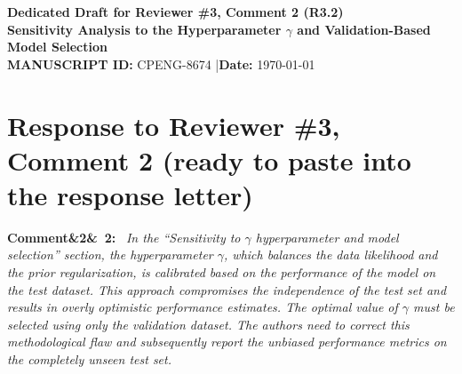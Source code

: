 \documentclass[11pt]{article}
\newenvironment{rcomment}[1]{\par\bigskip\noindent\textbf{Comment\ifx&#1&\else\ #1\fi:}\ \itshape}{\par}
\begin{document}
\begin{center}
{\Large\bfseries Dedicated Draft for Reviewer \#3, Comment 2 (R3.2)}\\[6pt]
\textbf{Sensitivity Analysis to the Hyperparameter $\gamma$ and Validation-Based Model Selection}\\[4pt]
\textbf{MANUSCRIPT ID:} CPENG-8674 \quad|\quad \textbf{Date:} \today
\end{center}

\section*{Response to Reviewer \#3, Comment 2 (ready to paste into the response letter)}

\begin{rcomment}{2}
In the ``Sensitivity to $\gamma$ hyperparameter and model selection'' section, the hyperparameter $\gamma$, which
balances the data likelihood and the prior regularization, is calibrated based on the performance of the model on the
test dataset. This approach compromises the independence of the test set and results in overly optimistic performance
estimates. The optimal value of $\gamma$ must be selected using only the validation dataset. The authors need to
correct this methodological flaw and subsequently report the unbiased performance metrics on the completely unseen test
set.
\end{rcomment}
\end{document}
